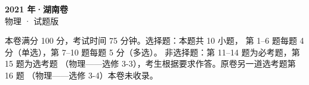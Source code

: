 \documentclass[zihao=-4, a4paper]{ctexart}
\begin{document}
\begin{center}
  {\Large\bfseries 2021 年·湖南卷}\\[4pt]
  {\large 物理 · 试题版}
\end{center}
\medskip
\begin{gknotice}
  本卷满分 100 分，考试时间 75 分钟。选择题：本题共 10 小题，
  第 1--6 题每题 4 分（单选），第 7--10 题每题 5 分（多选）。
  非选择题：第 11--14 题为必考题，第 15 题为选考题
  （物理——选修 3-3），考生根据要求作答。原卷另一道选考题第 16 题
  （物理——选修 3-4）本卷未收录。
\end{gknotice}

\end{document}

